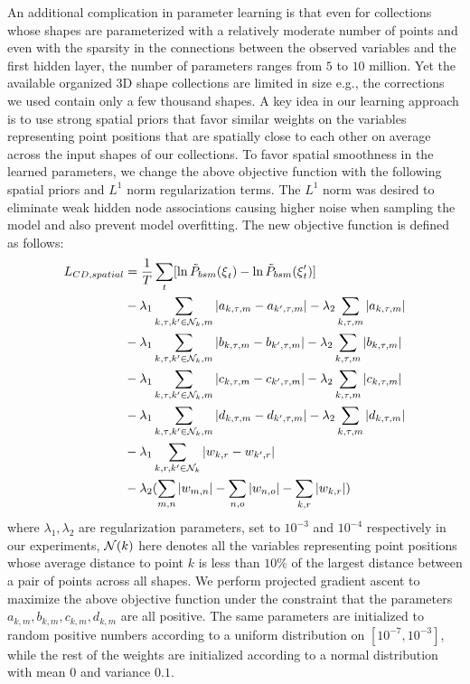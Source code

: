 An additional complication in parameter learning is that even for collections whose shapes are parameterized with a relatively moderate number of points and even with the sparsity in the connections between the observed variables and the first hidden layer, the number of parameters ranges from $5$ to $10$ million. Yet the available organized 3D shape collections are limited in size e.g., the corrections we used contain only a few thousand shapes. A key idea in our learning approach is to use strong spatial priors that favor similar weights on the variables representing point positions that are spatially close to each other on average across the input shapes of our collections. To favor spatial smoothness in the learned parameters, we change the above objective function with the following spatial priors and $L^1$ norm regularization terms. The $L^1$ norm was desired to eliminate weak hidden node associations causing higher noise when sampling the model and also prevent model overfitting. The new objective function is defined as follows:
\begin{align*}
L_{CD,spatial} & = \frac{1}{T} \sum\limits_t [ \ln \tilde{P}_{bsm}(\mbox{\relax$\xi$}_t) - \ln \tilde{P}_{bsm}(\mbox{\relax$\xi$}'_t) ] 
\nonumber \\
& - \lambda_1 \sum\limits_{k,\tau,k' \in \mathcal{N}_k,m} | a_{k,\tau,m} - a_{k',\tau,m} | - \lambda_2 \sum\limits_{k,\tau,m} | a_{k,\tau,m} | 
\nonumber \\
& - \lambda_1 \sum\limits_{k,\tau,k' \in \mathcal{N}_k,m} | b_{k,\tau,m} - b_{k',\tau,m} | - \lambda_2 \sum\limits_{k,\tau,m} | b_{k,\tau,m} | 
\nonumber \\
& - \lambda_1 \sum\limits_{k,\tau,k' \in \mathcal{N}_k,m} | c_{k,\tau,m} - c_{k',\tau,m} | - \lambda_2 \sum\limits_{k,\tau,m} | c_{k,\tau,m} | 
\nonumber \\
& - \lambda_1 \sum\limits_{k,\tau,k' \in \mathcal{N}_k,m} | d_{k,\tau,m} - d_{k',\tau,m} | - \lambda_2 \sum\limits_{k,\tau,m} | d_{k,\tau,m} | 
\nonumber \\
& - \lambda_1 \sum\limits_{k,r,k' \in \mathcal{N}_k} | w_{k,r} - w_{k',r} | 
\nonumber \\
& - \lambda_2( \sum\limits_{m,n} | w_{m,n} | - \sum\limits_{n,o} | w_{n,o} | - \sum\limits_{k,r} | w_{k,r} | ) \\
\end{align*}
where $\lambda_1, \lambda_2$ are regularization parameters, set to $10^{-3}$ and $10^{-4}$ respectively in our experiments, $\mathcal{N}(k)$ here denotes all the variables representing point positions whose average distance to point $k$ is less than $10\%$ of the largest distance between a pair of points across all shapes. We perform projected gradient ascent to maximize the above objective function under the constraint that the parameters $a_{k,m}, b_{k,m},c_{k,m},d_{k,m}$ are all positive. The same parameters are initialized to random positive numbers according to a uniform distribution on $[10^{-7},10^{-3}]$, while the rest of the weights are initialized according to a normal distribution with mean $0$ and variance $0.1$. 

